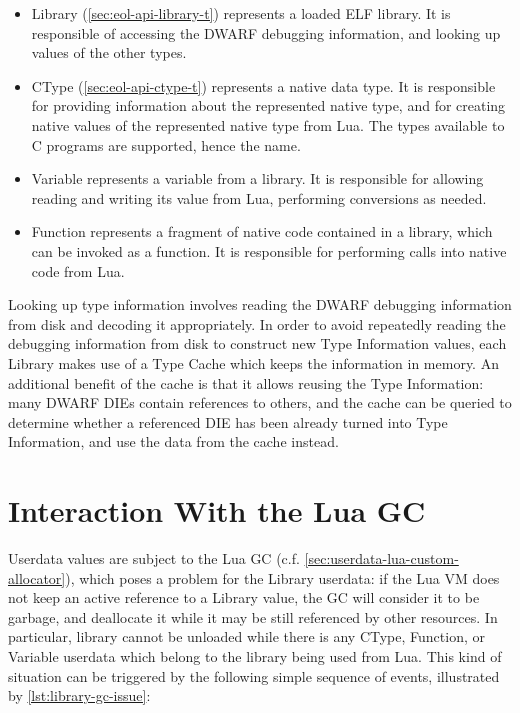 \begin{itemize}

	\item \textsf{Library} (\autoref{sec:eol-api-library-t}) represents a loaded
	ELF library. It is responsible of accessing the DWARF debugging information,
	and looking up values of the other types.

	\item \textsf{CType} (\autoref{sec:eol-api-ctype-t}) represents a native
	data type. It is responsible for providing information about the represented
	native type, and for creating native values of the represented native type
	from Lua. The types available to C programs are supported, hence the name.

	\item \textsf{Variable} represents a variable from a library. It is
		responsible for allowing reading and writing its value from Lua,
		performing conversions as needed.

	\item \textsf{Function} represents a fragment of native code contained in a
		library, which can be invoked as a function. It is responsible for
		performing calls into native code from Lua.

\end{itemize}

Looking up type information involves reading the DWARF debugging information
from disk and decoding it appropriately. In order to avoid repeatedly reading
the debugging information from disk to construct new \textsf{Type Information}
values, each \textsf{Library} makes use of a \textsf{Type Cache} which keeps
the information in memory. An additional benefit of the cache is that it
allows reusing the \textsf{Type Information}: many DWARF \gls{DIE}s contain
references to others, and the
cache can be queried to determine whether a referenced DIE has been already
turned into \textsf{Type Information}, and use the data from the cache
instead.


\section{Interaction With the Lua GC}
	\label{sec:design-gc-interaction}

Userdata values are subject to the Lua \gls{GC} (c.f.
\autoref{sec:userdata-lua-custom-allocator}), which poses a problem for the
\textsf{Library} userdata: if the Lua VM does not keep an active reference to
a \textsf{Library} value, the GC will consider it to be garbage, and
deallocate it while it may be still referenced by other resources. In
particular, library cannot be unloaded while there is any \textsf{CType},
\textsf{Function}, or \textsf{Variable} userdata which belong to the library
being used from Lua. This kind of situation can be triggered by the following
simple sequence of events, illustrated by \autoref{lst:library-gc-issue}:


